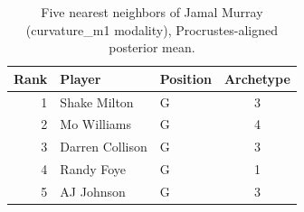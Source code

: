 \begin{table}[htbp]
  \centering\small
  \begin{tabular}{rllc}
    \toprule
    Rank & Player & Position & Archetype \\
    \midrule
    1 & Shake Milton & G & 3 \\
    2 & Mo Williams & G & 4 \\
    3 & Darren Collison & G & 3 \\
    4 & Randy Foye & G & 1 \\
    5 & AJ Johnson & G & 3 \\
    \bottomrule
  \end{tabular}
  \caption{Five nearest neighbors of Jamal Murray (curvature_m1 modality), Procrustes-aligned posterior mean.}
  \label{tab:Jamal_Murray_neighbors_curvature_m1}
\end{table}

